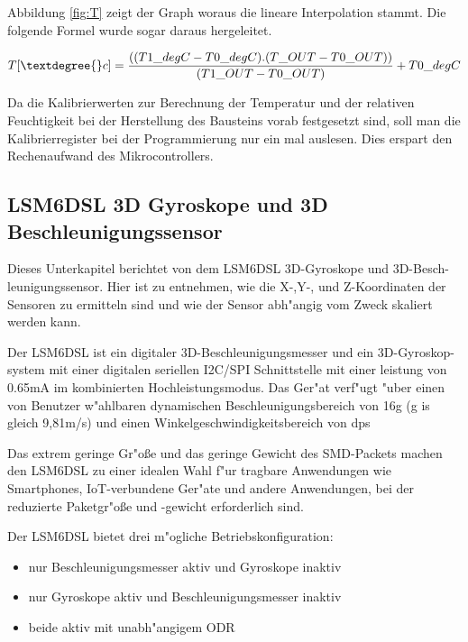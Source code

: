 Abbildung \ref{fig:T} zeigt der Graph woraus die lineare Interpolation 
stammt. Die folgende Formel wurde sogar daraus hergeleitet.

\begin{center}
	\[
	T[\textdegree{}c] = \frac{((T1\_degC - T0\_degC) . (T\_OUT - 
	T0\_OUT))}{(T1\_OUT - T0\_OUT) } + T0\_degC  
	\]\label{TempFormel}
\end{center}

Da die Kalibrierwerten zur Berechnung der Temperatur und der relativen 
Feuchtigkeit bei der Herstellung des Bausteins vorab festgesetzt sind, 
soll man die Kalibrierregister bei der Programmierung nur ein mal 
auslesen. Dies erspart den Rechenaufwand des Mikrocontrollers.
 
\subsection{LSM6DSL 3D Gyroskope und 3D Beschleunigungssensor}\label{Acc/Gy}

Dieses Unterkapitel berichtet von dem LSM6DSL 3D-Gyroskope und 
3D-Besch-leunigungssensor. Hier ist zu entnehmen, wie die X-,Y-, und 
Z-Koordinaten der Sensoren zu ermitteln sind und wie der Sensor 
abh"angig vom Zweck skaliert werden kann.
 

Der LSM6DSL ist ein digitaler 3D-Beschleunigungsmesser und ein 
3D-Gyroskop-system mit einer digitalen seriellen I2C/SPI Schnittstelle 
mit einer leistung von 0.65mA im kombinierten Hochleistungsmodus.
Das Ger"at verf"ugt "uber einen von Benutzer w"ahlbaren dynamischen 
Beschleunigungsbereich von  \textbar {} \textbar 
{} \textbar \textpm 16g (g is gleich 9,81m/s) und einen 
Winkelgeschwindigkeitsbereich von  \textbar {} 
\textbar {} \textbar {} \textbar {}\ac{dps}
 
Das extrem geringe Gr"o\ss{}e und das geringe Gewicht des \ac{SMD}-Packets 
machen den LSM6DSL zu einer idealen Wahl f"ur tragbare Anwendungen wie 
Smartphones, IoT-verbundene Ger"ate und andere Anwendungen, bei der 
reduzierte Paketgr"o\ss{}e und -gewicht erforderlich sind.  

Der LSM6DSL bietet drei m"ogliche Betriebskonfiguration:
\begin{itemize}
	\item nur Beschleunigungsmesser aktiv und Gyroskope inaktiv
	\item nur Gyroskope aktiv und Beschleunigungsmesser inaktiv
	\item beide aktiv mit unabh"angigem \ac{ODR} 
\end{itemize}

